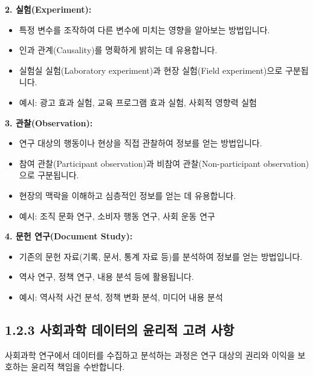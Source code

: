 \documentclass[
  letterpaper,
]{book}
\providecommand{\tightlist}{%
  \setlength{\itemsep}{0pt}\setlength{\parskip}{0pt}}
\begin{document}
\textbf{2. 실험(Experiment):}

\begin{itemize}
\tightlist
\item
  특정 변수를 조작하여 다른 변수에 미치는 영향을 알아보는 방법입니다.
\item
  인과 관계(Causality)를 명확하게 밝히는 데 유용합니다.
\item
  실험실 실험(Laboratory experiment)과 현장 실험(Field experiment)으로
  구분됩니다.
\item
  예시: 광고 효과 실험, 교육 프로그램 효과 실험, 사회적 영향력 실험
\end{itemize}

\textbf{3. 관찰(Observation):}

\begin{itemize}
\tightlist
\item
  연구 대상의 행동이나 현상을 직접 관찰하여 정보를 얻는 방법입니다.
\item
  참여 관찰(Participant observation)과 비참여 관찰(Non-participant
  observation)으로 구분됩니다.
\item
  현장의 맥락을 이해하고 심층적인 정보를 얻는 데 유용합니다.
\item
  예시: 조직 문화 연구, 소비자 행동 연구, 사회 운동 연구
\end{itemize}

\textbf{4. 문헌 연구(Document Study):}

\begin{itemize}
\tightlist
\item
  기존의 문헌 자료(기록, 문서, 통계 자료 등)를 분석하여 정보를 얻는
  방법입니다.
\item
  역사 연구, 정책 연구, 내용 분석 등에 활용됩니다.
\item
  예시: 역사적 사건 분석, 정책 변화 분석, 미디어 내용 분석
\end{itemize}

\subsection{1.2.3 사회과학 데이터의 윤리적 고려
사항}\label{uxc0acuxd68cuxacfcuxd559-uxb370uxc774uxd130uxc758-uxc724uxb9acuxc801-uxace0uxb824-uxc0acuxd56d}

사회과학 연구에서 데이터를 수집하고 분석하는 과정은 연구 대상의 권리와
이익을 보호하는 윤리적 책임을 수반합니다.
\end{document}
